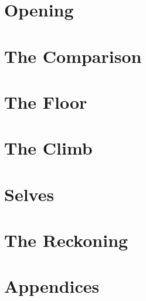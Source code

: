 \documentclass{article}
\begin{document}
\maketitle
\thispagestyle{plain}



\part{Opening}




\part{The Comparison}




\part{The Floor}




\part{The Climb}







\part{Selves}


\part{The Reckoning}




\appendix
\part{Appendices}


\nocite{*}


\end{document}
